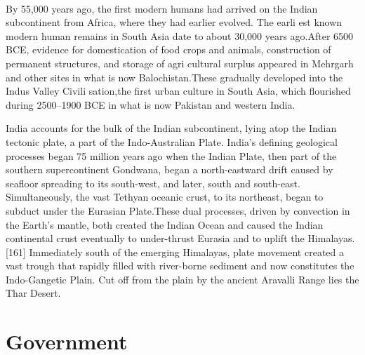 \documentclass[12pt,a4paper]{article}
\begin{document}
\paragraph{}
By 55,000 years ago, the first modern humans had arrived on the Indian
subcontinent from Africa, where they had earlier evolved. The earli
est known modern human remains in South Asia date to about 30,000
years ago.After 6500 BCE, evidence for domestication of food crops
and animals, construction of permanent structures, and storage of agri
cultural surplus appeared in Mehrgarh and other sites in what is now
Balochistan.These gradually developed into the Indus Valley Civili
sation,the first urban culture in South Asia, which flourished during
2500–1900 BCE in what is now Pakistan and western India.
\begin{flushright}
	India accounts for the bulk of the Indian subcontinent, lying atop the Indian tectonic plate, a part of the Indo-Australian Plate. India's defining geological processes began 75 million years ago when the Indian Plate, then part of the southern supercontinent Gondwana, began a north-eastward drift caused by seafloor spreading to its south-west, and later, south and south-east. Simultaneously, the vast Tethyan oceanic crust, to its northeast, began to subduct under the Eurasian Plate.These dual processes, driven by convection in the Earth's mantle, both created the Indian Ocean and caused the Indian continental crust eventually to under-thrust Eurasia and to uplift the Himalayas.[161] Immediately south of the emerging Himalayas, plate movement created a vast trough that rapidly filled with river-borne sediment and now constitutes the Indo-Gangetic Plain. Cut off from the plain by the ancient Aravalli Range lies the Thar Desert.
\end{flushright}

\section{Government}
\end{document}

